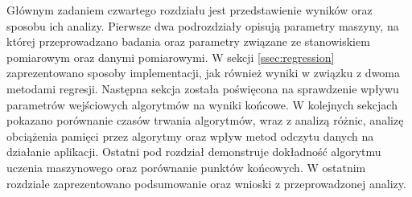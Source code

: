 Głównym zadaniem czwartego rozdziału jest przedstawienie wyników oraz sposobu ich analizy. Pierwsze dwa podrozdziały opisują parametry maszyny, na której przeprowadzano badania oraz parametry związane ze stanowiskiem pomiarowym oraz danymi pomiarowymi. W sekcji \ref{ssec:regression} zaprezentowano sposoby implementacji, jak również wyniki w związku z dwoma metodami regresji. Następna sekcja została poświęcona na sprawdzenie wpływu parametrów wejściowych algorytmów na wyniki końcowe. W kolejnych sekcjach pokazano porównanie czasów trwania algorytmów, wraz z analizą różnic, analizę obciążenia pamięci przez algorytmy oraz wpływ metod odczytu danych na działanie aplikacji. Ostatni pod rozdział demonstruje dokładność algorytmu uczenia maszynowego oraz porównanie punktów końcowych. W ostatnim rozdziale zaprezentowano podsumowanie oraz wnioski z przeprowadzonej analizy.